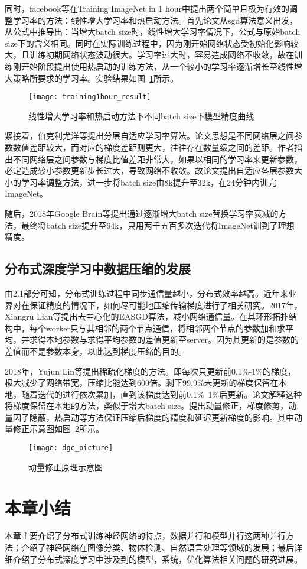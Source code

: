 同时，facebook等在Training ImageNet in 1 hour中提出两个简单且极为有效的调整学习率的方法：线性增大学习率和热启动方法。首先论文从sgd算法意义出发，从公式中推导出：当增大batch size时，线性增大学习率情况下，公式与原始batch size下的含义相同。同时在实际训练过程中，因为刚开始网络状态受初始化影响较大，且训练初期网络状态波动很大。学习率过大时，容易造成网络不收敛，故在训练刚开始阶段提出使用热启动的训练方法，从一个较小的学习率逐渐增长至线性增大策略所要求的学习率。实验结果如图~\ref{fig:training1hour_result}所示。

\begin{figure}[htp]
\centering
\texttt{[image: training1hour\_result]}
\caption{线性增大学习率和热启动方法下不同batch size下模型精度曲线}
\label{fig:training1hour_result}
\end{figure}
紧接着，伯克利尤洋等提出分层自适应学习率算法。论文思想是不同网络层之间参数数值差距较大，而对应的梯度差距则更大，往往存在数量级之间的差距。作者指出不同网络层之间参数与梯度比值差距非常大，如果以相同的学习率来更新参数，必定造成较小参数更新步长过大，导致网络不收敛。故论文提出自适应各层参数大小的学习率调整方法，进一步将batch size由8k提升至32k，在24分钟内训完ImageNet。

随后，2018年Google Brain等提出通过逐渐增大batch size替换学习率衰减的方法，最终将batch size提升至64k，只用两千五百多次迭代将ImageNet训到了理想精度。

\subsection{分布式深度学习中数据压缩的发展}
由2.1部分可知，分布式训练过程中同步通信量越小，分布式效率越高。近年来业界对在保证精度的情况下，如何尽可能地压缩传输梯度进行了相关研究。2017年，Xiangru Lian等提出去中心化的EASGD算法，减小网络通信量。在其环形拓扑结构中，每个worker只与其相邻的两个节点通信，将相邻两个节点的参数加和求平均，并求得本地参数与求得平均参数的差值更新至server。因为其更新的是参数的差值而不是参数本身，以此达到梯度压缩的目的。

2018年，Yujun Lin等提出稀疏化梯度的方法。即每次只更新前0.1\%-1\%的梯度，极大减少了网络带宽，压缩比能达到600倍。剩下99.9\%未更新的梯度保留在本地，随着迭代的进行依次累加，直到该梯度达到前0.1\%~1\%后更新。论文解释这种将梯度保留在本地的方法，类似于增大batch size。提出动量修正，梯度修剪，动量因子隐蔽，热启动等方法保证压缩后梯度的精度和延迟更新梯度的影响。其中动量修正示意图如图~\ref{fig:dgc_picture}所示。
\begin{figure}[htp]
\centering
\texttt{[image: dgc\_picture]}
\caption{动量修正原理示意图}
\label{fig:dgc_picture}
\end{figure}

\section{本章小结}
本章主要介绍了分布式训练神经网络的特点，数据并行和模型并行这两种并行方法；介绍了神经网络在图像分类、物体检测、自然语言处理等领域的发展；最后详细介绍了分布式深度学习中涉及到的模型，系统，优化算法相关问题的研究进展。




